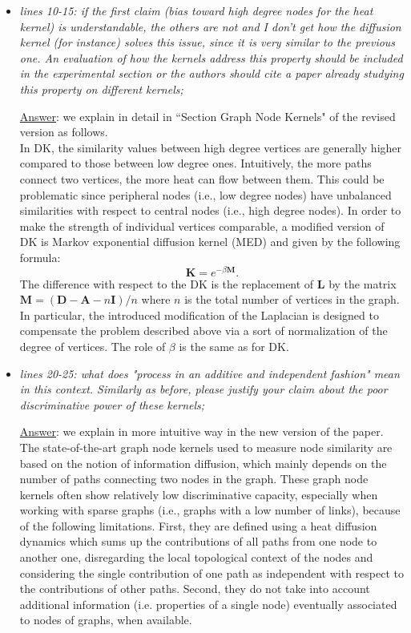 \documentclass[11pt]{article}
\begin{document}
\begin{itemize}
\item \textit{lines 10-15: if the first claim (bias toward high degree nodes for the heat kernel) is understandable, the others are not and I don't get how the diffusion kernel (for instance) solves this issue, since it is very similar to the previous one. An evaluation of how the kernels address this property should be included in the experimental section or the authors should cite a paper already studying this property on different kernels;}

\underline{Answer}: we explain in detail in ``Section Graph Node Kernels" of the revised version as follows.\\

In DK, the similarity values between high degree vertices are generally higher compared to those between low degree ones. Intuitively, the more paths connect two vertices, the more heat can flow between them. This could be problematic since peripheral nodes (i.e., low degree nodes) have unbalanced similarities with respect to central nodes (i.e., high degree nodes). In order to make the strength of individual vertices comparable, a modified version of DK is Markov exponential diffusion kernel (MED) and given by the following formula:
\begin{equation}
\textbf{K} = e^{-\beta \textbf{M}}.
\end{equation}
The difference with respect to the DK is the replacement of $\textbf{L}$ by the matrix $\textbf{M}=(\textbf{D}-\textbf{A}-n\textbf{I})/n$ where $n$ is the total number of vertices in the graph. In particular, the introduced modification of the Laplacian is designed to compensate the problem described above via a sort of normalization of the degree of vertices. The role of $\beta$ is the same as for DK.

\item \textit{lines 20-25: what does "process in an additive and independent fashion" mean in this context. Similarly as before, please justify your claim about the poor discriminative power of these kernels;}

\underline{Answer}: we explain in more intuitive way in the new version of the paper.\\

The state-of-the-art graph node kernels used to measure node similarity are based on the notion of information diffusion, which mainly depends on the number of paths connecting two nodes in the graph. These graph node kernels often show relatively low discriminative capacity, especially when working with sparse graphs (i.e., graphs with a  low number of  links), because of the following limitations. First, they are defined using a heat diffusion dynamics which sums up the contributions of all  paths from one node to another one, disregarding the local topological context of the nodes and considering the single contribution of one path as independent with respect to the contributions of other paths.
Second, they do not take into account additional information (i.e. properties of a single node) eventually associated to nodes of graphs, when available.


\end{itemize}
\end{document}
